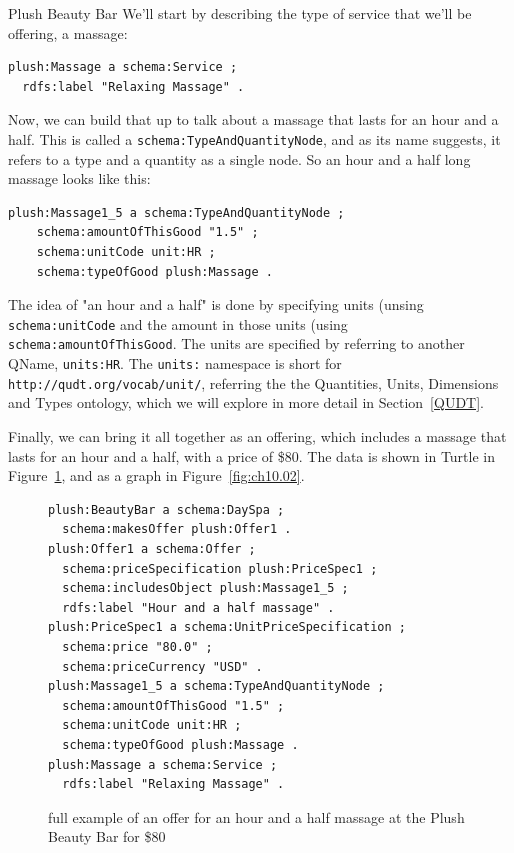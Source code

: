 \begin{example}{Plush Beauty Bar}
We'll start by describing the type of service that we'll be offering, a massage:


\begin{lstlisting}
plush:Massage a schema:Service ;
  rdfs:label "Relaxing Massage" .
\end{lstlisting}

Now, we can build that up to talk about a massage that lasts for an hour
and a half.  This is called a \texttt{schema:TypeAndQuantityNode}, and as its 
name suggests, it refers to a type and a quantity as a single node.  
So an hour and a half long  massage looks like this:

\begin{lstlisting}
plush:Massage1_5 a schema:TypeAndQuantityNode ;
    schema:amountOfThisGood "1.5" ;
    schema:unitCode unit:HR ;  
    schema:typeOfGood plush:Massage .
\end{lstlisting}

The idea of "an hour and a half" is done by specifying units (unsing \texttt{schema:unitCode} and the amount in those units (using \texttt{schema:amountOfThisGood}.  The units are specified by referring 
to another QName, \texttt{units:HR}.  The \texttt{units:} namespace
is short for \texttt{http://qudt.org/vocab/unit/}, referring the the Quantities, Units, Dimensions and Types ontology, which we will explore in more detail in 
Section~\ref{QUDT}. 

Finally, we can bring it all together as an offering, which includes a massage
that lasts for an hour and a half, with a price of \$80.  The data is shown in 
Turtle in Figure~\ref{fig:ch10.plushdata}, and as a graph in Figure~\ref{fig:ch10.02}.

\begin{figure}
\begin{lstlisting}
plush:BeautyBar a schema:DaySpa ;
  schema:makesOffer plush:Offer1 .
plush:Offer1 a schema:Offer ;
  schema:priceSpecification plush:PriceSpec1 ;
  schema:includesObject plush:Massage1_5 ;
  rdfs:label "Hour and a half massage" .
plush:PriceSpec1 a schema:UnitPriceSpecification ;
  schema:price "80.0" ;
  schema:priceCurrency "USD" .
plush:Massage1_5 a schema:TypeAndQuantityNode ;
  schema:amountOfThisGood "1.5" ;
  schema:unitCode unit:HR ;  
  schema:typeOfGood plush:Massage .
plush:Massage a schema:Service ;
  rdfs:label "Relaxing Massage" .
\end{lstlisting}
    \caption{full example of an offer for an hour and a half massage at the Plush Beauty Bar for \$80}
    \label{fig:ch10.plushdata}
\end{figure}


\end{example}
